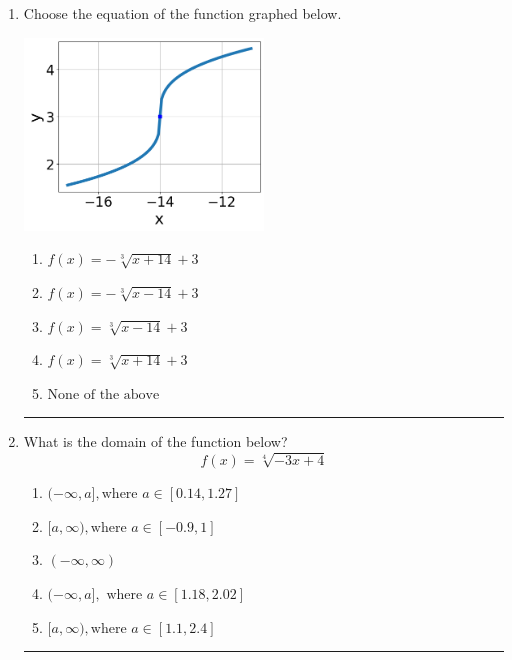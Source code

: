 \documentclass[14pt]{extbook}
\newcommand{\litem}[1]{\item#1\hspace*{-1cm}\rule{\textwidth}{0.4pt}}
\begin{document}
\begin{enumerate}
{\begin{enumerate}[label=\Alph*.]
\end{enumerate} }
\litem{
Choose the equation of the function graphed below.
\begin{center}
    \includegraphics[width=0.5\textwidth]{../Figures/radicalGraphToEquationCopyC.png}
\end{center}
\begin{enumerate}[label=\Alph*.]
\item \( f(x) = - \sqrt[3]{x + 14} + 3 \)
\item \( f(x) = - \sqrt[3]{x - 14} + 3 \)
\item \( f(x) = \sqrt[3]{x - 14} + 3 \)
\item \( f(x) = \sqrt[3]{x + 14} + 3 \)
\item \( \text{None of the above} \)

\end{enumerate} }
\litem{
What is the domain of the function below?\[ f(x) = \sqrt[4]{-3 x + 4} \]\begin{enumerate}[label=\Alph*.]
\item \( (-\infty, a], \text{where } a \in [0.14, 1.27] \)
\item \( [a, \infty), \text{where } a \in [-0.9, 1] \)
\item \( (-\infty, \infty) \)
\item \( (-\infty, a], \text{ where } a \in [1.18, 2.02] \)
\item \( [a, \infty), \text{where } a \in [1.1, 2.4] \)


\end{enumerate}}
\end{enumerate}
\end{document}
